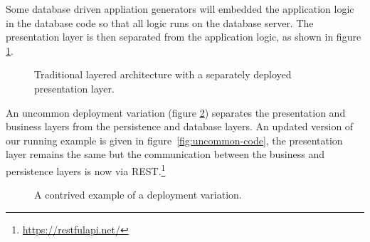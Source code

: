 Some database driven appliation generators will embedded the application logic in the database code
so that all logic runs on the database server.
The presentation layer is then separated from the application logic,
as shown in figure \ref{fig:layered-pres-separated}.

\begin{figure}[ht]
    \centering
    \caption{Traditional layered architecture with a separately deployed presentation layer.}
    \label{fig:layered-pres-separated}
\end{figure}

An uncommon deployment variation (figure \ref{fig:uncommon-diagram}) separates
the presentation and business layers from the persistence and database layers.
An updated version of our running example is given in figure~\ref{fig:uncommon-code},
the presentation layer remains the same but the communication between the
business and persistence layers is now via REST.\footnote{\url{https://restfulapi.net/}}

\begin{figure}[ht]
    \centering
    \caption{A contrived example of a deployment variation.}
    \label{fig:uncommon-diagram}
\end{figure}

